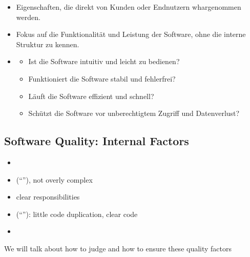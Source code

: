 \begin{infoBox}[title=Externe Qualitätsfaktoren]
    \begin{itemize}
        \item {} Eigenschaften, die direkt von Kunden oder Endnutzern whargenommen werden.
        \item {} Fokus auf die Funktionalität und Leistung der Software, ohne die interne Struktur zu kennen.
        \item {}
        \begin{itemize}
            \item {} Ist die Software intuitiv und leicht zu bedienen?
            \item {} Funktioniert die Software stabil und fehlerfrei?
            \item {} Läuft die Software effizient und schnell?
            \item {} Schützt die Software vor unberechtigtem Zugriff und Datenverlust?
        \end{itemize}
    \end{itemize}
\end{infoBox}
\subsection{Software Quality: Internal Factors}
\begin{defBox}[title=Some important internal quality factors]
    \begin{itemize}
        \item {}
        \item {} (\enquote{}), not overly complex
        \item {} clear responsibilities
        \item {} (\enquote{}): little code duplication, clear code
        \item {}
    \end{itemize}
\end{defBox}
\begin{defBox}
    We will talk about how to judge and how to ensure these quality factors
\end{defBox}
